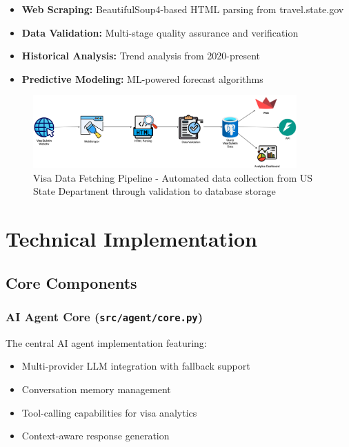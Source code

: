 \documentclass[11pt,a4paper]{article}
\newcommand{\code}[1]{\texttt{#1}}
\begin{document}
\begin{itemize}[itemsep=0.3em]
    \item \textbf{Web Scraping:} BeautifulSoup4-based HTML parsing from travel.state.gov
    \item \textbf{Data Validation:} Multi-stage quality assurance and verification
    \item \textbf{Historical Analysis:} Trend analysis from 2020-present
    \item \textbf{Predictive Modeling:} ML-powered forecast algorithms
\end{itemize}

\begin{figure}[h!]
\centering
\includegraphics[width=0.9\textwidth]{visa-data-fetching.png}
\caption{Visa Data Fetching Pipeline - Automated data collection from US State Department through validation to database storage}
\label{fig:data-pipeline}
\end{figure}

\newpage
\section{Technical Implementation}

\subsection{Core Components}

\subsubsection{AI Agent Core (\code{src/agent/core.py})}
The central AI agent implementation featuring:
\begin{itemize}[itemsep=0.2em]
    \item Multi-provider LLM integration with fallback support
    \item Conversation memory management
    \item Tool-calling capabilities for visa analytics
    \item Context-aware response generation
\end{itemize}
\end{document}
